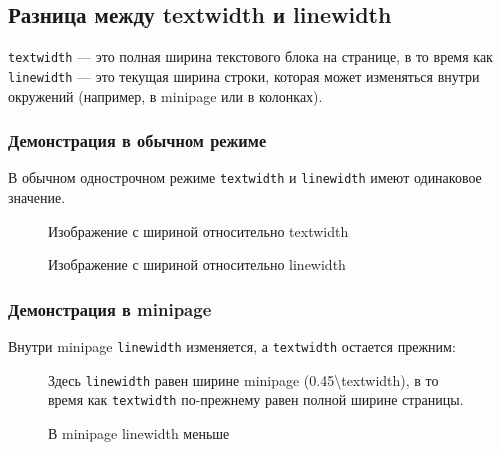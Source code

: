 \documentclass[12pt,a4paper]{article}
\begin{document}
\subsection{Разница между textwidth и linewidth}

\texttt{textwidth} — это полная ширина текстового блока на странице, в то время как \texttt{linewidth} — это текущая ширина строки, которая может изменяться внутри окружений (например, в minipage или в колонках).

\subsubsection{Демонстрация в обычном режиме}

В обычном однострочном режиме \texttt{textwidth} и \texttt{linewidth} имеют одинаковое значение.

\begin{figure}[h]
\centering
{}
\caption{Изображение с шириной относительно textwidth}
\label{fig:textwidth_demo}
\end{figure}

\begin{figure}[h]
\centering
{}
\caption{Изображение с шириной относительно linewidth}
\label{fig:linewidth_demo}
\end{figure}

\subsubsection{Демонстрация в minipage}

Внутри minipage \texttt{linewidth} изменяется, а \texttt{textwidth} остается прежним:

\begin{figure}[h]
\centering
\begin{minipage}{0.45\textwidth}
    \centering
    \caption{В minipage linewidth меньше}
    \label{fig:minipage_line}
\end{minipage}
\hfill
\begin{minipage}{0.45\textwidth}
    \centering
    \small
    Здесь \texttt{linewidth} равен ширине minipage (0.45\textbackslash textwidth), в то время как \texttt{textwidth} по-прежнему равен полной ширине страницы.
\end{minipage}
\end{figure}
\end{document}
